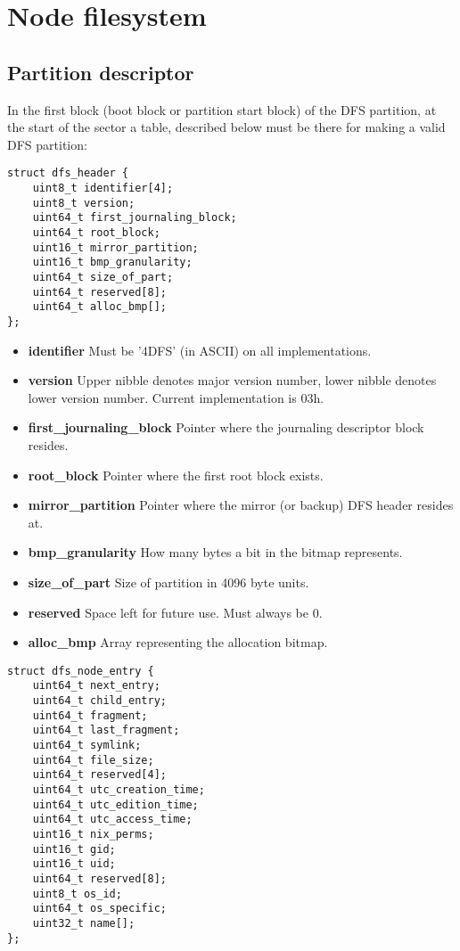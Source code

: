 \documentclass[12pt]{article}
\begin{document}
\section{Node filesystem}

\subsection{Partition descriptor}

In the first block (boot block or partition start block) of the DFS partition, at the start of the sector a table, described below must be there for making a valid DFS partition:

\begin{verbatim}
struct dfs_header {
	uint8_t identifier[4];
	uint8_t version;
	uint64_t first_journaling_block;
	uint64_t root_block;
	uint16_t mirror_partition;
	uint16_t bmp_granularity;
	uint64_t size_of_part;
	uint64_t reserved[8];
	uint64_t alloc_bmp[];
};
\end{verbatim}

\begin{itemize}
	\item \textbf{identifier} Must be '4DFS' (in ASCII) on all implementations.
	\item \textbf{version} Upper nibble denotes major version number, lower nibble denotes lower version number. Current implementation is 03h.
	\item \textbf{first\_journaling\_block} Pointer where the journaling descriptor block resides.
	\item \textbf{root\_block} Pointer where the first root block exists.
	\item \textbf{mirror\_partition} Pointer where the mirror (or backup) DFS header resides at.
	\item \textbf{bmp\_granularity} How many bytes a bit in the bitmap represents.
	\item \textbf{size\_of\_part} Size of partition in 4096 byte units.
	\item \textbf{reserved} Space left for future use. Must always be 0.
	\item \textbf{alloc\_bmp} Array representing the allocation bitmap.
\end{itemize}

\begin{verbatim}
struct dfs_node_entry {
	uint64_t next_entry;
	uint64_t child_entry;
	uint64_t fragment;
	uint64_t last_fragment;
	uint64_t symlink;
	uint64_t file_size;
	uint64_t reserved[4];
	uint64_t utc_creation_time;
	uint64_t utc_edition_time;
	uint64_t utc_access_time;
	uint16_t nix_perms;
	uint16_t gid;
	uint16_t uid;
	uint64_t reserved[8];
	uint8_t os_id;
	uint64_t os_specific;
	uint32_t name[];
};
\end{verbatim}
\end{document}
